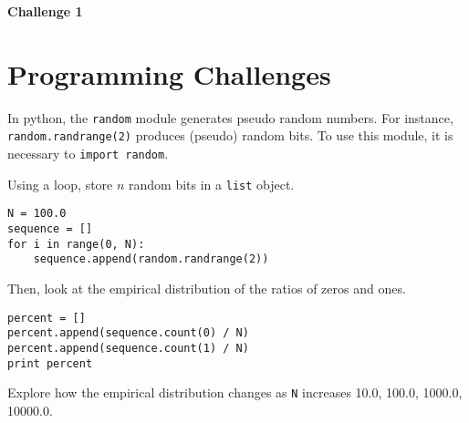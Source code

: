 \documentclass[11pt]{article}
\begin{document}
\begin{center}
{\bfseries \LARGE Challenge 1}
\end{center}

\section*{Programming Challenges}

In python, the \texttt{random} module generates pseudo random numbers.
For instance, \texttt{random.randrange(2)} produces (pseudo) random bits.
To use this module, it is necessary to \texttt{import random}.

Using a loop, store $n$ random bits in a \texttt{list} object.
\begin{verbatim}
N = 100.0
sequence = []
for i in range(0, N):
    sequence.append(random.randrange(2))
\end{verbatim}
Then, look at the empirical distribution of the ratios of zeros and ones.
\begin{verbatim}
percent = []
percent.append(sequence.count(0) / N)
percent.append(sequence.count(1) / N)
print percent
\end{verbatim}
Explore how the empirical distribution changes as \texttt{N} increases 10.0, 100.0, 1000.0, 10000.0.
\end{document}
